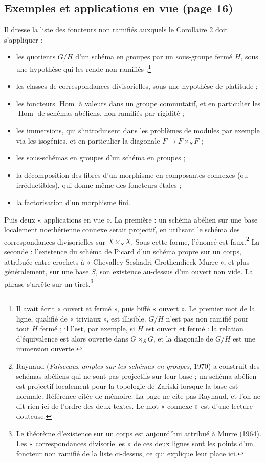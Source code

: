 \documentclass[11pt,a4paper]{article}
\begin{document}
\subsection*{Exemples et applications en vue (page 16)}

Il dresse la liste des foncteurs non ramifiés auxquels le Corollaire 2 doit
s'appliquer :
\begin{itemize}
\item les quotients $G/H$ d'un schéma en groupes par un sous-groupe fermé
$H$, sous une hypothèse qui les rende non ramifiés ;\footnote{Il avait écrit
« ouvert et fermé », puis biffé « ouvert ». Le premier mot de la ligne,
qualifié de « triviaux », est illisible. $G/H$ n'est pas non ramifié pour tout
$H$ fermé ; il l'est, par exemple, si $H$ est ouvert et fermé : la relation
d'équivalence est alors ouverte dans $G \times_S G$, et la diagonale de $G/H$
est une immersion ouverte.}
\item les classes de correspondances divisorielles, sous une hypothèse de
platitude ;
\item les foncteurs $\operatorname{Hom}$ à valeurs dans un groupe
commutatif, et en particulier les $\operatorname{Hom}$ de schémas abéliens,
non ramifiés par rigidité ;
\item les immersions, qui s'introduisent dans les problèmes de modules par
exemple via les isogénies, et en particulier la diagonale $F \to F \times_S
F$ ;
\item les sous-schémas en groupes d'un schéma en groupes ;
\item la décomposition des fibres d'un morphisme en composantes connexes (ou
irréductibles), qui donne même des foncteurs étales ;
\item la factorisation d'un morphisme fini.
\end{itemize}

Puis deux « applications en vue ». La première : un schéma abélien sur une
base localement noethérienne connexe serait projectif, en utilisant le schéma
des correspondances divisorielles sur $X \times_S X$. Sous cette forme,
l'énoncé est faux.\footnote{Raynaud (\emph{Faisceaux amples sur les schémas
en groupes}, 1970) a construit des schémas abéliens qui ne sont pas
projectifs sur leur base ; un schéma abélien est projectif localement pour la
topologie de Zariski lorsque la base est normale. Référence citée de mémoire.
La page ne cite pas Raynaud, et l'on ne dit rien ici de l'ordre des deux
textes. Le mot « connexe » est d'une lecture douteuse.} La seconde :
l'existence du schéma de Picard d'un schéma propre sur un corps, attribuée
entre crochets à « Chevalley-Seshadri-Grothendieck-Murre », et plus
généralement, sur une base $S$, son existence au-dessus d'un ouvert non vide.
La phrase s'arrête sur un tiret.\footnote{Le théorème d'existence sur un
corps est aujourd'hui attribué à Murre (1964). Les « correspondances
divisorielles » de ces deux lignes sont les points d'un foncteur non ramifié
de la liste ci-dessus, ce qui explique leur place ici.}
\end{document}
